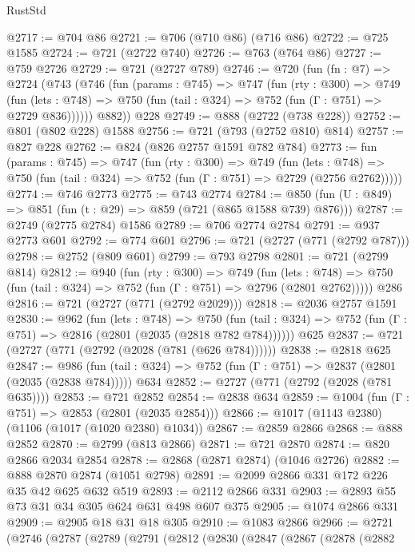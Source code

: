 \begin{lexlean}{RustStd}
\begin{coremodule}
@2717 := @704 @86
@2721 := @706 (@710 @86) (@716 @86)
@2722 := @725 @1585
@2724 := @721 (@2722 @740)
@2726 := @763 (@764 @86)
@2727 := @759 @2726
@2729 := @721 (@2727 @789)
@2746 := @720
    (fun (fn : @7) =>
    @2724
      (@743
        (@746
          (fun (params : @745) =>
          @747
            (fun (rty : @300) =>
            @749
              (fun (lets : @748) =>
              @750 (fun (tail : @324) => @752 (fun (Γ : @751) => @2729 @836))))))
        @882))
    @228
@2749 := @888 (@2722 (@738 @228))
@2752 := @801 (@802 @228) @1588
@2756 := @721 (@793 (@2752 @810) @814)
@2757 := @827 @228
@2762 := @824 (@826 @2757 @1591 @782 @784)
@2773 := fun (params : @745) =>
  @747
    (fun (rty : @300) =>
    @749
      (fun (lets : @748) =>
      @750 (fun (tail : @324) => @752 (fun (Γ : @751) => @2729 (@2756 @2762)))))
@2774 := @746 @2773
@2775 := @743 @2774
@2784 := @850 (fun (U : @849) => @851 (fun (t : @29) => @859 (@721 (@865 @1588 @739) @876)))
@2787 := @2749 (@2775 @2784) @1586
@2789 := @706 @2774 @2784
@2791 := @937 @2773 @601
@2792 := @774 @601
@2796 := @721 (@2727 (@771 (@2792 @787)))
@2798 := @2752 (@809 @601)
@2799 := @793 @2798
@2801 := @721 (@2799 @814)
@2812 := @940
    (fun (rty : @300) =>
    @749
      (fun (lets : @748) =>
      @750 (fun (tail : @324) => @752 (fun (Γ : @751) => @2796 (@2801 @2762)))))
    @286
@2816 := @721 (@2727 (@771 (@2792 @2029)))
@2818 := @2036 @2757 @1591
@2830 := @962
    (fun (lets : @748) =>
    @750 (fun (tail : @324) => @752 (fun (Γ : @751) => @2816 (@2801 (@2035 (@2818 @782 @784))))))
    @625
@2837 := @721 (@2727 (@771 (@2792 (@2028 (@781 (@626 @784))))))
@2838 := @2818 @625
@2847 := @986
    (fun (tail : @324) => @752 (fun (Γ : @751) => @2837 (@2801 (@2035 (@2838 @784)))))
    @634
@2852 := @2727 (@771 (@2792 (@2028 (@781 @635))))
@2853 := @721 @2852
@2854 := @2838 @634
@2859 := @1004 (fun (Γ : @751) => @2853 (@2801 (@2035 @2854)))
@2866 := @1017 (@1143 @2380) (@1106 (@1017 (@1020 @2380) @1034))
@2867 := @2859 @2866
@2868 := @888 @2852
@2870 := @2799 (@813 @2866)
@2871 := @721 @2870
@2874 := @820 @2866 @2034 @2854
@2878 := @2868 (@2871 @2874) (@1046 @2726)
@2882 := @888 @2870 @2874 (@1051 @2798)
@2891 := @2099 @2866 @331 @172 @226 @35 @42 @625 @632 @519
@2893 := @2112 @2866 @331
@2903 := @2893 @55 @73 @31 @34 @305 @624 @631 @498 @607 @375
@2905 := @1074 @2866 @331
@2909 := @2905 @18 @31 @18 @305
@2910 := @1083 @2866
@2966 := @2721
    (@2746
      (@2787
        (@2789
          (@2791
            (@2812
              (@2830
                (@2847
                  (@2867
                    (@2878
                      (@2882

\end{coremodule}
\end{lexlean}
